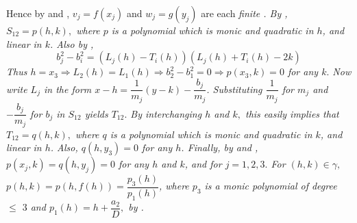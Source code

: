 Hence by  and , $v_{j}=f(x_{j})$ and $w_{j}=g(y_{j})$ are each \it finite \rm. By , $S_{12}=p(h,k),$ where $p$ is a polynomial which is monic and quadratic in $h$, and linear in $k$. Also by , $$b_{j}^{2}-b_{i}^{2}=\left( L_{j}(h)-T_{i}(h)\right) \left( L_{j}(h)+T_{i}(h)-2k\right)\tag{51}$$ Thus $h=x_{3}\Rightarrow L_{2}(h)=L_{1}(h)\Rightarrow b_{2}^{2}-b_{1}^{2}=0\Rightarrow p(x_{3},k)=0$ for any $k.$ Now write $L_{j}$ in the form $x-h=\dfrac{1}{m_{j}}(y-k)-\dfrac{b_{j}}{m_{j}}$. Substituting $\dfrac{1}{m_{j}}$ for $m_{j}$ and $-\dfrac{b_{j}}{m_{j}}$ for $b_{j}$ in $S_{12}$ yields $T_{12}.$ By interchanging $h$ and $k,$ this easily implies that $T_{12}=q(h,k),$ where $q$ is a polynomial which is monic and quadratic in $k$, and linear in $h$. Also, $q(h,y_{3})=0$ for any $h$. Finally, by  and , $p(x_{j},k)=q(h,y_{j})=0$ for any $h$ and $k$, and for $j=1,2,3.$ For $(h,k)\in \gamma,$ $p(h,k)=p(h,f(h))=\dfrac{p_{3}(h)}{p_{1}(h)}$, where 
$p_{3}$ is a monic polynomial of degree $\leq$ $3$ and $p_{1}(h)=h+\dfrac{a_{2}}{D},$ by . 
